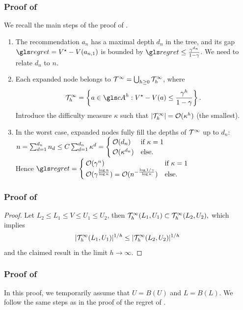 \subsubsection{Proof of }
\label{sec:proof-regret-opd}
We recall the main steps of the proof of \citet{Hren2008}.\\

\begin{enumerate}
	\item The recommendation $a_n$ has a maximal depth $d_n$ in the tree, and its gap $\regret = V^\star - V({a_{n,1}})$ is bounded by $\regret \leq \frac{\gamma^{d_n}}{1-\gamma}$. We need to relate $d_n$ to $n$.
	
	\item Each expanded node belongs to $\mathcal{T}^\infty = \bigcup_{h\geq 0} \mathcal{T}_h^\infty$, where $$\Tau_h^\infty = \left\{a\in \cA^h: V^\star-V(a) \leq \frac{\gamma^h}{1-\gamma}\right\}.$$ Introduce the difficulty measure $\kappa$ such that $|\mathcal{T}_h^\infty| = \mathcal{O}(\kappa^h)$ (the smallest).
	
	\item In the worst case, expanded nodes fully fill the depths of $\mathcal{T}^\infty$ up to $d_n$: $n = \sum_{d=1}^{d_n} n_d \leq  C\sum_{d=1}^{d_n} \kappa^d = \begin{cases}
	\mathcal{O}(d_n) &\text{if $\kappa=1$}\\
	\mathcal{O}(\kappa^{d_n}) &\text{else.}
	\end{cases}$\\
	Hence $\regret = \begin{cases}
	\cO(\gamma^n) &\text{if $\kappa=1$}\\
	\cO(\gamma^{\frac{\log n}{\log \kappa}}) = \cO(n^{-\frac{\log 1/\gamma}{\log \kappa}}) &\text{else.}
	\end{cases}$
\end{enumerate}

\subsubsection{Proof of }
\label{sec:proof-shrink}
\begin{proof}
Let $L_2\leq L_1\leq V\leq U_1\leq U_2$, then $\mathcal{T}_h^\infty(L_1,U_1) \subset \mathcal{T}_h^\infty(L_2,U_2),$ which implies $$|\mathcal{T}_h^\infty(L_1,U_1)|^{1/h} \leq |\mathcal{T}_h^\infty(L_2,U_2)|^{1/h}$$ and the claimed result in the limit $h\rightarrow\infty$.
\end{proof}

\subsubsection{Proof of }
\label{sec:proof-regret-bound-U}
In this proof, we temporarily assume that $U=B(U)$ and $L=B(L)$. We follow the same steps as in the proof of the regret of \OPD.

